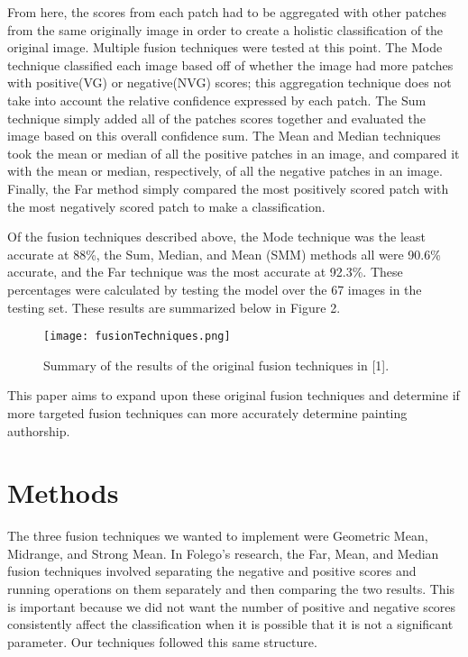 \documentclass{article}
\begin{document}
From here, the scores from each patch had to be aggregated with other patches from the same originally image in order to create a holistic classification of the original image. Multiple fusion techniques were tested at this point. The Mode technique classified each image based off of whether the image had more patches with positive(VG) or negative(NVG) scores; this aggregation technique does not take into account the relative confidence expressed by each patch. The Sum technique simply added all of the patches scores together and evaluated the image based on this overall confidence sum. The Mean and Median techniques took the mean or median of all the positive patches in an image, and compared it with the mean or median, respectively, of all the negative patches in an image. Finally, the Far method simply compared the most positively scored patch with the most negatively scored patch to make a classification. 


Of the fusion techniques described above, the Mode technique was the least accurate at 88\%, the Sum, Median, and Mean (SMM) methods all were 90.6\% accurate, and the Far technique was the most accurate at 92.3\%. These percentages were calculated by testing the model over the 67 images in the testing set. These results are summarized below in Figure 2. 

\begin{figure}
\begin{center}
\texttt{[image: fusionTechniques.png]}
\end{center}
\caption{Summary of the results of the original fusion techniques in [1].}
\end{figure}


This paper aims to expand upon these original fusion techniques and determine if more targeted fusion techniques can more accurately determine painting authorship. 




\section{Methods}



The three fusion techniques we wanted to implement were Geometric Mean, Midrange, and Strong Mean. In Folego’s research, the Far, Mean, and Median fusion techniques involved separating the negative and positive scores and running operations on them separately and then comparing the two results. This is important because we did not want the number of positive and negative scores consistently affect the classification when it is possible that it is not a significant parameter. Our techniques followed this same structure. 
\end{document}

